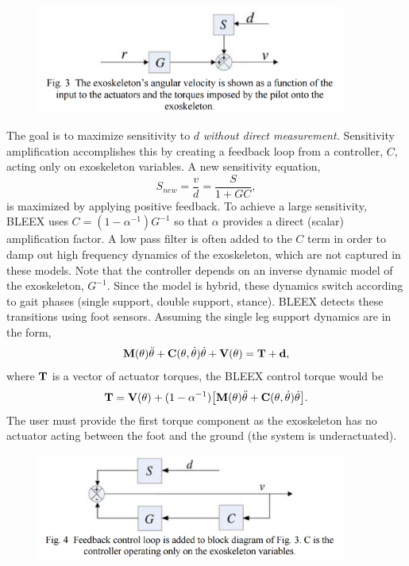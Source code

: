 \begin{figure}[ht]
  \centering
  \includegraphics[width=4.0in]{exos/figs/bleex_control_diag_1.png}
\end{figure}

The goal is to maximize sensitivity to $d$ \emph{without direct measurement.}  Sensitivity amplification accomplishes this by creating a feedback loop from a controller, $C$, acting only on exoskeleton variables.  A new sensitivity equation,
\[S_{new} = \frac{v}{d} = \frac{S}{1 + G C} ,\]
is maximized by applying positive feedback.  To achieve a large sensitivity, BLEEX uses $C = (1-\alpha^{-1})G^{-1}$ so that $\alpha$ provides a direct (scalar) amplification factor. A low pass filter is often added to the $C$ term in order to damp out high frequency dynamics of the exoskeleton, which are not captured in these models.  Note that the controller depends on an inverse dynamic model of the exoskeleton, $G^{-1}$.  Since the model is hybrid, these dynamics switch according to gait phases (single support, double support, stance).  BLEEX detects these transitions using foot sensors.  Assuming the single leg support dynamics are in the form,
\begin{equation}
{\bf M}({\bf\theta})\ddot{{\bf \theta}} + {\bf C}({\bf\theta},\dot{{\bf\theta}}) \dot{{\bf \theta}} + {\bf V}({\bf\theta}) = {\bf T} + {\bf d} ,
\end{equation}
where ${\bf T}$ is a vector of actuator torques, the BLEEX control torque would be
\begin{equation}
{\bf T} = {\bf V}({\bf\theta}) + (1 - \alpha^{-1}) \big [ {\bf M}({\bf\theta})\ddot{{\bf \theta}} + {\bf C}({\bf\theta},\dot{{\bf\theta}}) \dot{{\bf \theta}} \big ] .
\end{equation}
The user must provide the first torque component as the exoskeleton has no actuator acting between the foot and the ground (the system is underactuated).

\begin{figure}[ht]
  \centering
  \includegraphics[width=4.0in]{exos/figs/bleex_control_diag_2.png}
\end{figure}


